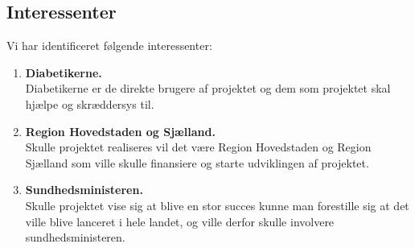 \subsection{Interessenter}
Vi har identificeret følgende interessenter:
\begin{enumerate}
	\item \textbf{Diabetikerne.}\\
	Diabetikerne er de direkte brugere af projektet og dem som projektet skal hjælpe og skræddersys til.
	\item \textbf{Region Hovedstaden og Sjælland.}\\
	Skulle projektet realiseres vil det være Region Hovedstaden og Region Sjælland som ville skulle finansiere og starte udviklingen af projektet.
	\item \textbf{Sundhedsministeren.}\\
	Skulle projektet vise sig at blive en stor succes kunne man forestille sig at det ville blive lanceret i hele landet, og ville derfor skulle involvere sundhedsministeren.
\end{enumerate}